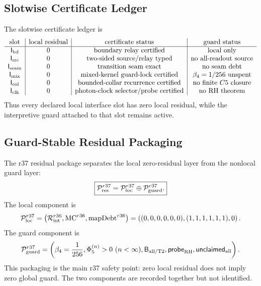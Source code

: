 \subsection{Slotwise Certificate Ledger}
\label{subsec:r37-slotwise-certificate-ledger}

The slotwise certificate ledger is
\[
\begin{array}{c|c|c|c}
\hbox{slot} & \hbox{local residual} & \hbox{certificate status} & \hbox{guard status}\\
\hline
\mathsf{I_{\rm bd}} & 0 & \hbox{boundary relay certified} & \hbox{local only}\\
\mathsf{I_{\rm src}} & 0 & \hbox{two-sided source/relay typed} & \hbox{no all-readout source}\\
\mathsf{I_{\rm seam}} & 0 & \hbox{transition seam exact} & \hbox{no seam debt}\\
\mathsf{I_{\rm mix}} & 0 & \hbox{mixed-kernel guard-lock certified} & \beta_4=1/256\hbox{ unspent}\\
\mathsf{I_{\rm col}} & 0 & \hbox{bounded-collar recurrence certified} & \hbox{no finite }C5\hbox{ closure}\\
\mathsf{I_{\rm clk}} & 0 & \hbox{photon-clock selector/probe certified} & \hbox{no RH theorem}
\end{array}
\]
Thus every declared local interface slot has zero local residual, while the
interpretive guard attached to that slot remains active.

\subsection{Guard-Stable Residual Packaging}
\label{subsec:r37-guard-stable-residual-packaging}

The r37 residual package separates the local zero-residual layer from the
nonlocal guard layer:
\[
\boxed{
\mathcal P_{\rm res}^{r37}
=
\mathcal P_{\rm loc}^{r37}
\oplus
\mathcal P_{\rm guard}^{r37}.
}
\]
The local component is
\[
\mathcal P_{\rm loc}^{r37}
=
\left(
\mathcal R_{\rm int}^{r36},
\mathrm{MC}^{r36},
\mathrm{mapDebt}^{r36}
\right)
=
\left((0,0,0,0,0,0),(1,1,1,1,1,1),0\right).
\]
The guard component is
\[
\mathcal P_{\rm guard}^{r37}
=
\left(
\beta_4={1\over256},
\Phi_5^{(n)}>0\ (n<\infty),
\mathsf B_{\rm all/T2},
\mathsf{probe}_{\rm RH},
\mathsf{unclaimed}_{\rm all}
\right).
\]
This packaging is the main r37 safety point: zero local residual does not imply
zero global guard.  The two components are recorded together but not identified.

